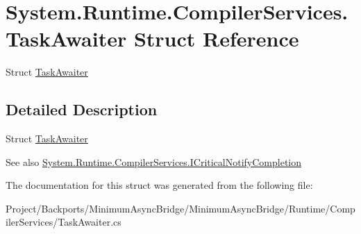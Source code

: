 \hypertarget{struct_system_1_1_runtime_1_1_compiler_services_1_1_task_awaiter}{}\section{System.\+Runtime.\+Compiler\+Services.\+Task\+Awaiter Struct Reference}
\label{struct_system_1_1_runtime_1_1_compiler_services_1_1_task_awaiter}


Struct \hyperlink{struct_system_1_1_runtime_1_1_compiler_services_1_1_task_awaiter}{Task\+Awaiter}  




\subsection{Detailed Description}
Struct \hyperlink{struct_system_1_1_runtime_1_1_compiler_services_1_1_task_awaiter}{Task\+Awaiter} 

\begin{DoxySeeAlso}{See also}
\hyperlink{interface_system_1_1_runtime_1_1_compiler_services_1_1_i_critical_notify_completion}{System.\+Runtime.\+Compiler\+Services.\+I\+Critical\+Notify\+Completion}


\end{DoxySeeAlso}


The documentation for this struct was generated from the following file\+:\begin{DoxyCompactItemize}
\item 
Project/\+Backports/\+Minimum\+Async\+Bridge/\+Minimum\+Async\+Bridge/\+Runtime/\+Compiler\+Services/Task\+Awaiter.\+cs\end{DoxyCompactItemize}
